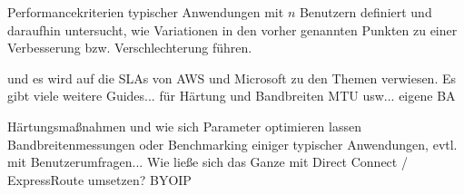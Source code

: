 Performancekriterien typischer Anwendungen mit $n$ Benutzern definiert und daraufhin untersucht, wie Variationen in den vorher genannten Punkten zu einer Verbesserung bzw. Verschlechterung führen.

und es wird auf die SLAs von AWS und Microsoft zu den Themen verwiesen.
Es gibt viele weitere Guides... für Härtung und Bandbreiten MTU usw... eigene BA

Härtungsmaßnahmen und wie sich Parameter optimieren lassen
Bandbreitenmessungen oder Benchmarking einiger typischer Anwendungen, evtl. mit Benutzerumfragen...
Wie ließe sich das Ganze mit Direct Connect / ExpressRoute umsetzen?
BYOIP
\fi
